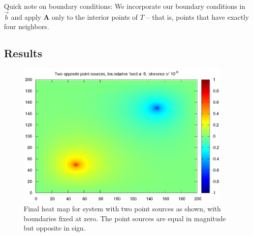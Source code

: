 \documentclass[paper=a4, fontsize=11pt]{scrartcl} %
\numberwithin{equation}{section} %
\numberwithin{figure}{section} %
\numberwithin{table}{section} %
\newcommand{\matr}[1]{\mathbf{#1}}
\begin{document}
Quick note on boundary conditions: We incorporate our boundary conditions in $\vec{b}$ and apply $\matr{A}$ only to the interior points of $T$ -- that is, points that have exactly four neighbors.

\subsection{Results}

\begin{figure}
\centering
\includegraphics[width=400px]{heatmap1.eps}
\caption{Final heat map for system with two point sources as shown, with boundaries fixed at zero. The point sources are equal in magnitude but opposite in sign.}
\label{fig:cgheatmap}
\end{figure}
\end{document}
